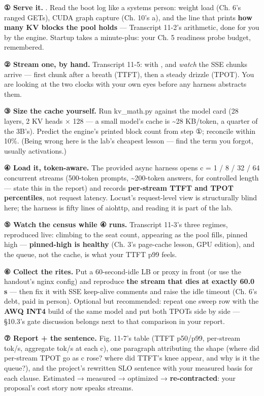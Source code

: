 \begin{tbbitemize}
  \item \textbf{① Serve it.} . Read the boot log like a systems person: weight load (Ch. 6's ranged GETs), CUDA graph capture (Ch. 10's a), and the line that prints \textbf{how many KV blocks the pool holds} — Transcript 11-2's arithmetic, done for you by the engine. Startup takes a minute-plus: your Ch. 5 readiness probe budget, remembered.
  \item \textbf{② Stream one, by hand.} Transcript 11-5:  with , and \textit{watch} the SSE chunks arrive — first chunk after a breath (TTFT), then a steady drizzle (TPOT). You are looking at the two clocks with your own eyes before any harness abstracts them.
  \item \textbf{③ Size the cache yourself.} Run kv\_math.py against the model card (28 layers, 2 KV heads × 128 — a small model's cache is \textasciitilde{}28 KB/token, a quarter of the 3B's). Predict the engine's printed block count from step ①; reconcile within 10\%. (Being wrong here is the lab's cheapest lesson — find the term you forgot, usually activations.)
  \item \textbf{④ Load it, token-aware.} The provided async harness opens c = 1 / 8 / 32 / 64 concurrent streams (500-token prompts, \textasciitilde{}200-token answers,  for controlled length — state this in the report) and records \textbf{per-stream TTFT and TPOT percentiles}, not request latency. Locust's request-level view is structurally blind here; the harness is fifty lines of aiohttp, and reading it is part of the lab.
  \item \textbf{⑤ Watch the census while ④ runs.} Transcript 11-3's three regimes, reproduced live:  climbing to the seat count,  appearing as the pool fills,  pinned high — \textbf{pinned-high is healthy} (Ch. 3's page-cache lesson, GPU edition), and the queue, not the cache, is what your TTFT p99 feels.
  \item \textbf{⑥ Collect the rites.} Put a 60-second-idle LB or proxy in front (or use the handout's nginx config) and reproduce \textbf{the stream that dies at exactly 60.0 s} — then fix it with SSE keep-alive comments and raise the idle timeout (Ch. 6's debt, paid in person). Optional but recommended: repeat one sweep row with the \textbf{AWQ INT4} build of the same model and put both TPOTs side by side — §10.3's gate discussion belongs next to that comparison in your report.
  \item \textbf{⑦ Report + the sentence.} Fig. 11-7's table (TTFT p50/p99, per-stream tok/s, aggregate tok/s at each c), one paragraph attributing the shape (where did per-stream TPOT go as c rose? where did TTFT's knee appear, and why is it the queue?), and the project's rewritten SLO sentence with your measured basis for each clause. Estimated → measured → optimized → \textbf{re-contracted}: your proposal's cost story now speaks streams.
\end{tbbitemize}

